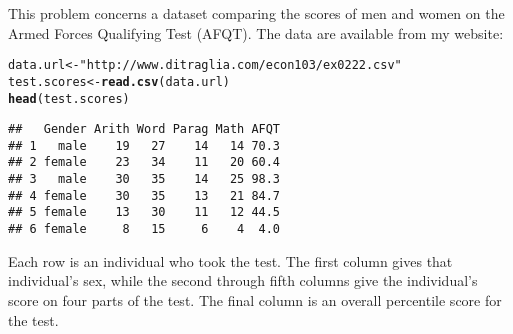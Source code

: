 \documentclass[addpoints,12pt]{exam}\usepackage[]{graphicx}\usepackage[]{color}
\makeatletter
\newcommand{\hlstr}[1]{\textcolor[rgb]{0.192,0.494,0.8}{#1}}%
\newcommand{\hlstd}[1]{\textcolor[rgb]{0.345,0.345,0.345}{#1}}%
\newcommand{\hlkwb}[1]{\textcolor[rgb]{0.69,0.353,0.396}{#1}}%
\newcommand{\hlkwd}[1]{\textcolor[rgb]{0.737,0.353,0.396}{\textbf{#1}}}%
\newenvironment{kframe}{%
 \def\at@end@of@kframe{}%
 \ifinner\ifhmode%
  \def\at@end@of@kframe{\end{minipage}}%
  \begin{minipage}{\columnwidth}%
 \fi\fi%
 \def\FrameCommand##1{\hskip\@totalleftmargin \hskip-\fboxsep
 \colorbox{shadecolor}{##1}\hskip-\fboxsep
     \hskip-\linewidth \hskip-\@totalleftmargin \hskip\columnwidth}%
 \MakeFramed {\advance\hsize-\width
   \@totalleftmargin\z@ \linewidth\hsize
   \@setminipage}}%
 {\par\unskip\endMakeFramed%
 \at@end@of@kframe}
\newenvironment{knitrout}{}{} %
\makeatother
\begin{document}
\begin{questions}
\question This problem concerns a dataset comparing the scores of men and women on the Armed Forces Qualifying Test (AFQT). The data are available from my website:
\begin{knitrout}
\color{fgcolor}\begin{kframe}
\begin{alltt}
\hlstd{data.url} \hlkwb{<-} \hlstr{"http://www.ditraglia.com/econ103/ex0222.csv"}
\hlstd{test.scores} \hlkwb{<-} \hlkwd{read.csv}\hlstd{(data.url)}
\hlkwd{head}\hlstd{(test.scores)}
\end{alltt}
\begin{verbatim}
##   Gender Arith Word Parag Math AFQT
## 1   male    19   27    14   14 70.3
## 2 female    23   34    11   20 60.4
## 3   male    30   35    14   25 98.3
## 4 female    30   35    13   21 84.7
## 5 female    13   30    11   12 44.5
## 6 female     8   15     6    4  4.0
\end{verbatim}
\end{kframe}
\end{knitrout}
Each row is an individual who took the test. The first column gives that individual's sex, while the second through fifth columns give the individual's score on four parts of the test. The final column is an overall percentile score for the test. 
\end{questions}
\end{document}
